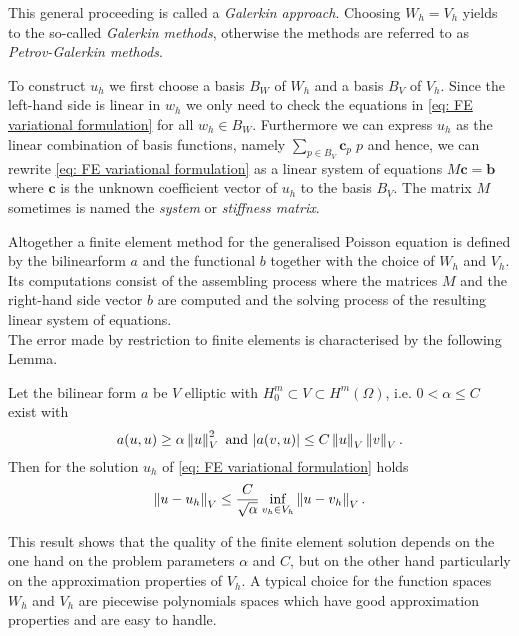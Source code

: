 This general proceeding is called a \emph{Galerkin approach}. Choosing $W_h = V_h$ yields to the so-called \emph{Galerkin methods}, otherwise the methods are referred to as \emph{Petrov-Galerkin methods}.

To construct $u_h$ we first choose a basis $B_W$ of $W_h$ and a basis $B_V$ of $V_h$.
Since the left-hand side is linear in $w_h$ we only need to check the equations in \eqref{eq: FE variational formulation} for all $w_h \in B_W$. 
Furthermore we can express $u_h$ as the linear combination of basis functions, namely $\sum_{p \in B_V} \mathbf{c}_p \; p$ and hence, we can rewrite \eqref{eq: FE variational formulation} as a linear system of equations $M \mathbf{c} = \mathbf{b}$ where  $\mathbf{c}$ is the unknown coefficient vector of $u_h$ to the basis $B_V$.  The matrix $M$ sometimes is named the \emph{system} or \emph{stiffness matrix}.

Altogether a finite element method for the generalised Poisson equation is defined by the bilinearform $a$ and the functional $b$ together with the choice of $W_h$ and $V_h$. Its computations consist of the assembling process where the matrices $M$ and the right-hand side vector $b$ are computed and the solving process of the resulting linear system of equations.\\
The error made by restriction to finite elements is characterised by the following Lemma.
\begin{lemma} \label{la: Ceas lemma}
	Let the bilinear form $a$ be $V$ elliptic with $H_0^m \subset V \subset H^m(\Omega) $, i.e. $0 < \alpha \leq C$ exist with
	\[
		a(u,u) \geq \alpha  \left\lVert u \right\rVert ^2_V \text{ and } |a(v,u)| \leq C \left\lVert u \right\rVert _V \left\lVert v \right\rVert _V.
	\]
	Then for the solution $u_h$ of \eqref{eq: FE variational formulation}  holds
	\begin{align}
		\left\lVert u - u_h \right\rVert_V \leq \frac C {\sqrt \alpha} \inf\limits_{v_h \in V_h} \left\lVert u-v_h \right\rVert_V.
	\end{align}
\end{lemma}
This result shows that the quality of the finite element solution depends on the one hand on the problem parameters $\alpha$ and $C$, but on the other hand particularly on the approximation properties of $V_h$. A typical choice for the function spaces $W_h$ and $V_h$ are piecewise polynomials spaces which have good approximation properties and are easy to handle.

